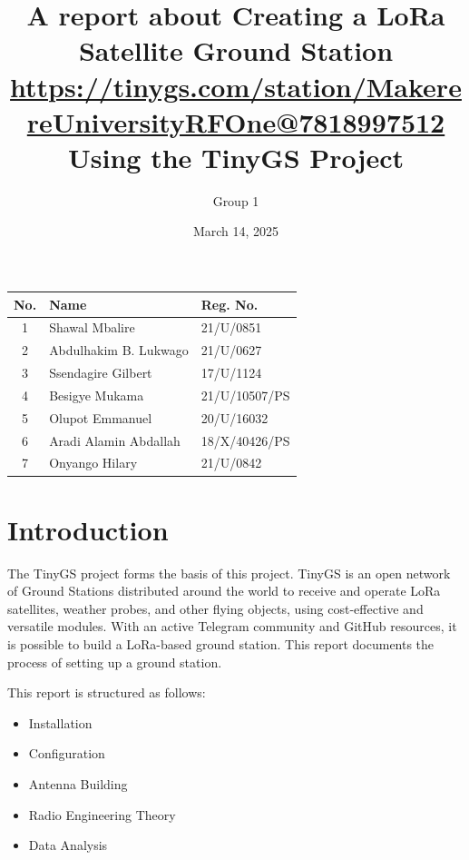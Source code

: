 \documentclass[12pt,a4paper]{article}
\title{
    A report about Creating a LoRa Satellite Ground Station  \\
    \vspace{0.5cm}
    \small{
        \href{https://tinygs.com/station/MakerereUniversityRFOne@7818997512}{https://tinygs.com/station/MakerereUniversityRFOne@7818997512}
    } \\
    \vspace{0.5cm}
    \large Using the TinyGS Project \\
}
\author{Group 1}
\date{March 14, 2025}
\begin{document}
\maketitle

\begin{center}
    \renewcommand{\arraystretch}{1.5} %
    \begin{tabular}{|c|l|l|}
        \hline
        \textbf{No.} & \textbf{Name} & \textbf{Reg. No.} \\
        \hline
        1 & Shawal Mbalire & 21/U/0851 \\
        \hline
        2 & Abdulhakim B. Lukwago & 21/U/0627 \\
        \hline
        3 & Ssendagire Gilbert & 17/U/1124 \\
        \hline
        4 & Besigye Mukama & 21/U/10507/PS \\
        \hline
        5 & Olupot Emmanuel & 20/U/16032 \\
        \hline
        6 & Aradi Alamin Abdallah & 18/X/40426/PS \\
        \hline
        7&Onyango Hilary &21/U/0842 \\
        \hline
    \end{tabular}
\end{center}



\section{Introduction}
The TinyGS project \cite{tinygs} forms the basis of this project. TinyGS is an open network of Ground Stations distributed around the world to receive and operate LoRa satellites, weather probes, and other flying objects, using cost-effective and versatile modules. With an active Telegram community and GitHub resources, it is possible to build a LoRa-based ground station. This report documents the process of setting up a ground station.

This report is structured as follows:
\begin{itemize}
    \item Installation
    \item Configuration
    \item Antenna Building
    \item Radio Engineering Theory
    \item Data Analysis
\end{itemize}
\end{document}
